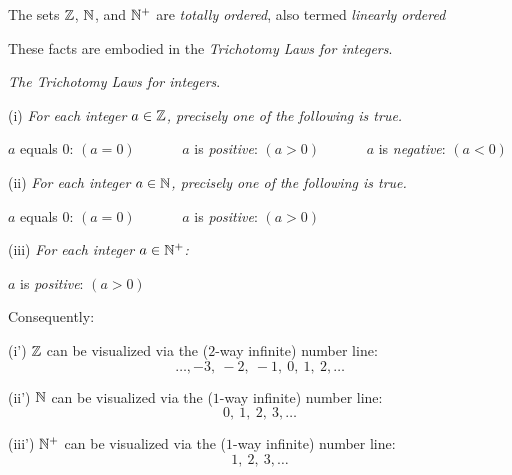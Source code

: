  
 


The sets $\mathbb{Z}$, $\mathbb{N}$, and $\mathbb{N}^+$ are {\em totally ordered}, also termed {\em linearly ordered}

\smallskip

 

These facts are embodied in the {\em Trichotomy Laws for integers}.

\medskip

{\it The Trichotomy Laws for integers}.

\smallskip

(i)
{\it For each integer $a \in \mathbb{Z}$, precisely one of the following is true.}

\hspace*{.2in} $a$ equals $0$: $(a=0)$ \ \ \ \ \ \
 $a$ is {\em positive}: $(a>0)$ \ \ \ \ \ \
 $a$ is {\em negative}: $(a<0)$

\smallskip

(ii)
{\it For each integer $a \in \mathbb{N}$, precisely one of the following is true.}

\hspace*{.2in} $a$ equals $0$: $(a=0)$ \ \ \ \ \ \ $a$ is {\em positive}: $(a>0)$

\smallskip

(iii)
{\it For each integer $a \in \mathbb{N}^+$:}

\hspace*{.2in} $a$ is {\em positive}: $(a>0)$

\bigskip

Consequently:
\smallskip


(i')
$\mathbb{Z}$ can be visualized via the ($2$-way infinite) number line:
\[ \ldots, -3, \  -2, \ -1, \ 0, \ 1,\  2, \ldots \]

\smallskip

(ii')
$\mathbb{N}$ can be visualized via the ($1$-way infinite) number line:
\[  0, \ 1, \ 2, \ 3, \ldots \]

\smallskip

(iii')
$\mathbb{N}^+$ can be visualized via the ($1$-way infinite) number line:
\[  1, \ 2, \ 3, \ldots \]

\medskip


